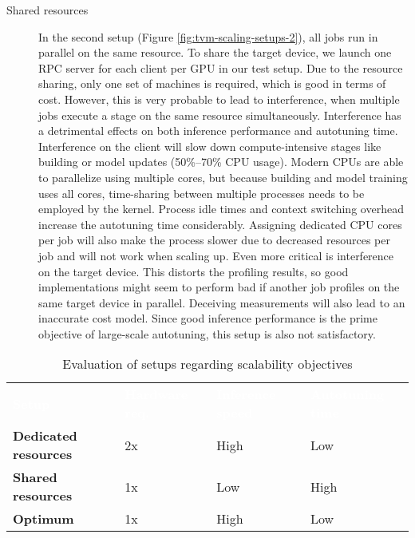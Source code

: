 \begin{description}
	\item[Shared resources] In the second setup (Figure \ref{fig:tvm-scaling-setups-2}), all jobs run in parallel on the same resource. To share the target device, we launch one RPC server for each client per GPU in our test setup. Due to the resource sharing, only one set of machines is required, which is good in terms of cost. However, this is very probable to lead to interference, when multiple jobs execute a stage on the same resource simultaneously. Interference has a detrimental effects on both inference performance and autotuning time. Interference on the client will slow down compute-intensive stages like building or model updates (50\%--70\% CPU usage). Modern CPUs are able to parallelize using multiple cores, but because building and model training uses all cores, time-sharing between multiple processes needs to be employed by the kernel. Process idle times and context switching overhead increase the autotuning time considerably. Assigning dedicated CPU cores per job will also make the process slower due to decreased resources per job and will not work when scaling up. Even more critical is interference on the target device. This distorts the profiling results, so good implementations might seem to perform bad if another job profiles on the same target device in parallel. Deceiving measurements will also lead to an inaccurate cost model. Since good inference performance is the prime objective of large-scale autotuning, this setup is also not satisfactory.
\end{description}

\begin{table}
	\newcommand\good[1]{\textcolor{hpe-green}{#1}}
	\newcommand\bad[1]{\textcolor{hpe-orange}{#1}}
	\newcommand\heading[1]{\textcolor{white}{\textbf{#1}}}
	\renewcommand{\arraystretch}{1.2}
	\sffamily
	\centering
	\begin{tabularx}{\textwidth}{l l l X}
	\rowcolor{black} \heading{Setup} & \heading{Hardware req.} & \heading{Inference speed} & \heading{Autotuning time} \vspace{2pt} \\
	\textbf{Dedicated resources} & \bad{2x} & \good{High} & \good{Low} \\
	\textbf{Shared resources} & \good{1x} & \bad{Low} & \bad{High} \\
	\textbf{Optimum} & \good{1x} & \good{High} & \good{Low} \\
	\end{tabularx}
	\caption{Evaluation of setups regarding scalability objectives}
	\label{tab:tvm-scaling-setups}
\end{table}

